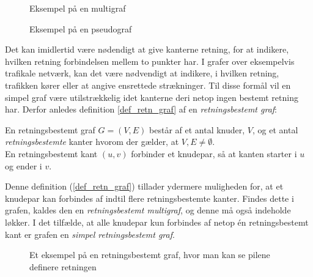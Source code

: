 \begin{figure}[!htb]
   \begin{minipage}{0.48\textwidth}
     \centering
     
     \caption{Eksempel på en multigraf}\label{Fig:Data1}
   \end{minipage}\hfill
   \begin{minipage}{0.48\textwidth}
     \centering
     
     \caption{Eksempel på en pseudograf}\label{Fig:Data2}
   \end{minipage}
\end{figure}


\noindent Det kan imidlertid være nødendigt at give kanterne retning, for at indikere, hvilken retning forbindelsen mellem to punkter har. I grafer over eksempelvis trafikale netværk, kan det være nødvendigt at indikere, i hvilken retning, trafikken kører eller at angive ensrettede strækninger. Til disse formål vil en simpel graf være utilstrækkelig idet kanterne deri netop ingen bestemt retning har. Derfor anledes definition \ref{def_retn_graf} 
af en \textit{retningsbestemt graf}:

\begin{defn}
En retningsbestemt graf $G = (V, E)$ består af et antal knuder, $V$, og et antal \textit{retningsbestemte} kanter hvorom der gælder, at $V, E \neq \emptyset$.\\
En retningsbestemt kant $(u,v)$ forbinder et knudepar, så at kanten starter i $u$ og ender i $v$.
\label{def_retn_graf}
\end{defn} 

\noindent Denne definition (\ref{def_retn_graf}) tillader ydermere muligheden for, at et knudepar kan forbindes af indtil flere retningsbestemte kanter. Findes dette i grafen, kaldes den en \textit{retningsbestemt multigraf}, og denne må også indeholde løkker. I det tilfælde, at alle knudepar kun forbindes af netop én retningsbestemt kant er grafen en \textit{simpel retningsbestemt graf}.

\begin{figure}[h]
\centering
\caption{Et eksempel på en retningsbestemt graf, hvor man kan se pilene definere retningen}
\end{figure}

